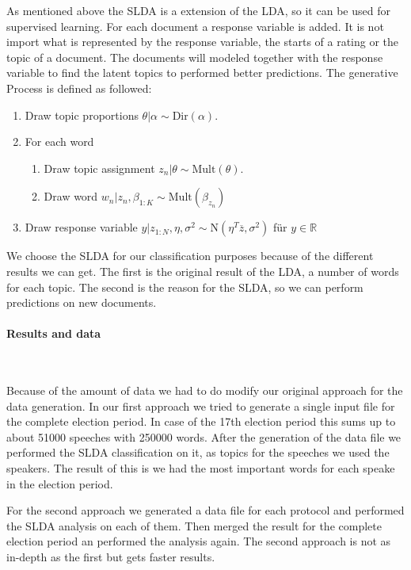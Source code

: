 \documentclass[12pt,paper=a4,nenglish]{scrreprt}
\begin{document}
As mentioned above the SLDA is a extension of the LDA, so it can be used for supervised learning. 
For each document a response variable is added. 
It is not import what is represented by the response variable, the starts of a rating or the topic of a document. 
The documents will modeled together with the response variable to find the latent topics to performed better predictions. 
The generative Process is defined as followed:

\begin{enumerate}
\item Draw topic proportions $ \theta | \alpha \sim \text{Dir}(\alpha) $.
\item For each word
\begin{enumerate}
\item Draw topic assignment $ z_n | \theta \sim \text{Mult}(\theta) $.
\item Draw word $ w_n | z_n, \beta_{1:K} \sim \text{Mult}(\beta_{z_n}) $
\end{enumerate}
\item Draw response variable $ y | z_{1:N}, \eta, \sigma^2 \sim \text{N}(\eta^T\overline{z}, \sigma^2) $ für $ y \in \mathbb{R} $
\end{enumerate}

We choose the SLDA for our classification purposes because of the different results we can get. 
The first is the original result of the LDA, a number of words for each topic. 
The second is the reason for the SLDA, so we can perform predictions on new documents.

\paragraph{Results and data} \hfill \\ \hfill

Because of the amount of data we had to do modify our original approach for the data generation. 
In our first approach we tried to generate a single input file for the complete election period. 
In case of the 17th election period this sums up to about 51000 speeches with 250000 words. 
After the generation of the data file we performed the SLDA classification on it, as topics for the speeches we used the speakers. 
The result of this is we had the most important words for each speake in the election period.

For the second approach we generated a data file for each protocol and performed the SLDA analysis on each of them. 
Then merged the result for the complete election period an performed the analysis again. 
The second approach is not as in-depth as the first but gets faster results.
\end{document}
